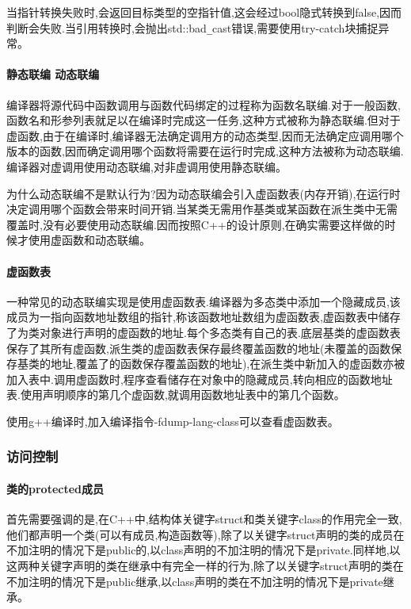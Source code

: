 \documentclass[UTF8]{ctexart}
\begin{document}
当指针转换失败时,会返回目标类型的空指针值,这会经过bool隐式转换到false,因而判断会失败.当引用转换时,会抛出std::bad\verb|_|cast错误,需要使用try-catch块捕捉异常。

\paragraph{静态联编 动态联编}
编译器将源代码中函数调用与函数代码绑定的过程称为函数名联编.对于一般函数,函数名和形参列表就足以在编译时完成这一任务,这种方式被称为静态联编.但对于虚函数,由于在编译时,编译器无法确定调用方的动态类型,因而无法确定应调用哪个版本的函数,因而确定调用哪个函数将需要在运行时完成,这种方法被称为动态联编.编译器对虚调用使用动态联编,对非虚调用使用静态联编。

为什么动态联编不是默认行为?因为动态联编会引入虚函数表(内存开销),在运行时决定调用哪个函数会带来时间开销.当某类无需用作基类或某函数在派生类中无需覆盖时,没有必要使用动态联编.因而按照C++的设计原则,在确实需要这样做的时候才使用虚函数和动态联编。

\paragraph{虚函数表}
一种常见的动态联编实现是使用虚函数表.编译器为多态类中添加一个隐藏成员,该成员为一指向函数地址数组的指针,称该函数地址数组为虚函数表,虚函数表中储存了为类对象进行声明的虚函数的地址.每个多态类有自己的表.底层基类的虚函数表保存了其所有虚函数,派生类的虚函数表保存最终覆盖函数的地址(未覆盖的函数保存基类的地址,覆盖了的函数保存覆盖函数的地址),在派生类中新加入的虚函数亦被加入表中.调用虚函数时,程序查看储存在对象中的隐藏成员,转向相应的函数地址表.使用声明顺序的第几个虚函数,就调用函数地址表中的第几个函数。

使用g++编译时,加入编译指令-fdump-lang-class可以查看虚函数表。

\subsubsection{访问控制}
\paragraph{类的protected成员}
首先需要强调的是,在C++中,结构体关键字struct和类关键字class的作用完全一致,他们都声明一个类(可以有成员,构造函数等),除了以关键字struct声明的类的成员在不加注明的情况下是public的,以class声明的不加注明的情况下是private.同样地,以这两种关键字声明的类在继承中有完全一样的行为,除了以关键字struct声明的类在不加注明的情况下是public继承,以class声明的类在不加注明的情况下是private继承。
\end{document}
